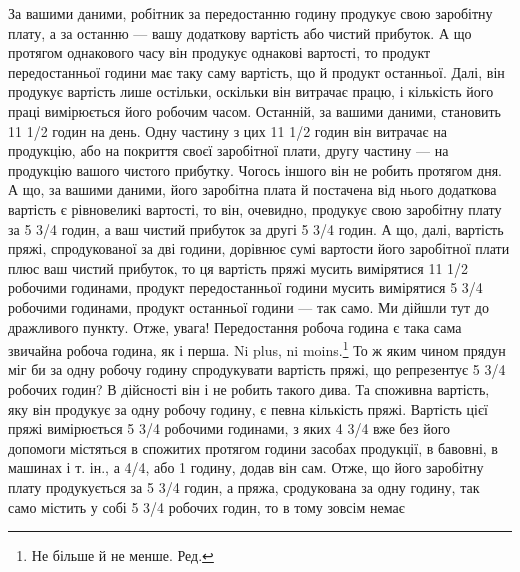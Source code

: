 За вашими даними, робітник за передостанню годину продукує свою заробітну плату, а за останню — вашу
додаткову вартість або чистий прибуток. А що протягом однакового часу він продукує
однакові вартості, то продукт передостанньої години має таку
саму вартість, що й продукт останньої. Далі, він продукує вартість лише остільки, оскільки він
витрачає працю, і кількість
його праці вимірюється його робочим часом. Останній, за вашими даними, становить 11 1/2 годин на
день. Одну частину з цих 11 1/2 годин
він витрачає на продукцію, або на покриття своєї заробітної плати, другу частину — на продукцію
вашого чистого прибутку. Чогось іншого він не робить протягом дня. А що, за вашими даними, його
заробітна плата й постачена від нього додаткова вартість є рівновеликі вартості, то він, очевидно,
продукує свою заробітну плату за 5 3/4 годин, а ваш чистий прибуток за другі
5 3/4 годин. А що, далі, вартість пряжі, спродукованої за дві години, дорівнює сумі вартости його
заробітної плати плюс ваш
чистий прибуток, то ця вартість пряжі мусить вимірятися 11 1/2 робочими
годинами, продукт передостанньої години мусить вимірятися 5 3/4 робочими годинами, продукт останньої
години — так
само. Ми дійшли тут до дражливого пункту. Отже, увага! Передостання робоча година є така сама
звичайна робоча година, як і
перша. Ni plus, ni moins.\footnote*{
Не більше й не менше. Ред.
} То ж яким чином прядун міг би за одну робочу годину спродукувати
вартість пряжі, що репрезентує 5 3/4 робочих годин? В дійсності він і не робить такого дива. Та
споживна вартість, яку він продукує за одну робочу годину, є певна кількість пряжі. Вартість цієї
пряжі вимірюється 5 3/4 робочими годинами, з яких 4 3/4 вже без його допомоги містяться в спожитих
протягом години засобах продукції, в бавовні, в машинах і т. ін., а 4/4, або 1 годину, додав він
сам. Отже, що його заробітну плату продукується за 5 3/4 годин, а пряжа, сродукована за одну годину,
так само містить у собі 5 3/4 робочих годин, то в тому зовсім немає
\parbreak{}  %
